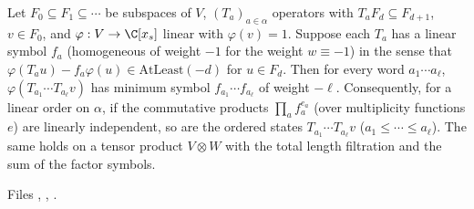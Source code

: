 \begin{theorem}\label{l11:thm:filteredwords}
Let $F_0\subseteq F_1\subseteq\cdots$ be subspaces of $V$, $(T_a)_{a\in\alpha}$ operators with $T_aF_d\subseteq F_{d+1}$,
$v\in F_0$, and $\varphi:V\to\C[x_s]$ linear with $\varphi(v) = 1$. Suppose each $T_a$ has a linear symbol $f_a$
(homogeneous of weight $-1$ for the weight $w\equiv-1$) in the sense that $\varphi(T_au)-f_a\varphi(u)\in\mathrm{AtLeast}(-d)$
for $u\in F_d$. Then for every word $a_1\cdots a_\ell$, $\varphi(T_{a_1}\cdots T_{a_\ell}v)$ has minimum symbol
$f_{a_1}\cdots f_{a_\ell}$ of weight $-\ell$. Consequently, for a linear order on $\alpha$, if the commutative products
$\prod_af_a^{e_a}$ (over multiplicity functions $e$) are linearly independent, so are the ordered states
$T_{a_1}\cdots T_{a_\ell}v$ ($a_1\le\cdots\le a_\ell$). The same holds on a tensor product $V\otimes W$ with the
total length filtration and the sum of the factor symbols.
\end{theorem}
{\sloppy \noindent Files ,
,
.\par}

